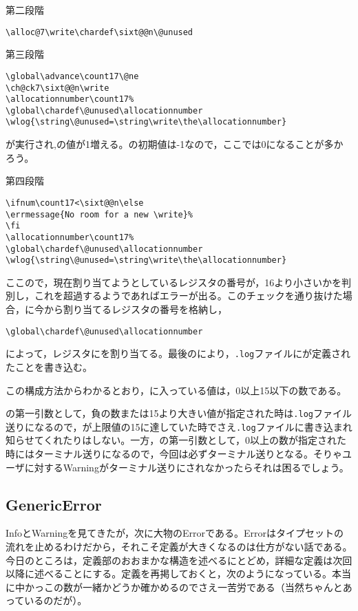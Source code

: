 \documentclass[autodetect-engine,dvipdfmx]{jsarticle}
\begin{document}
\noindent 第二段階
\texsource
\begin{lstlisting}
\alloc@7\write\chardef\sixt@@n\@unused
\end{lstlisting}

\noindent 第三段階
\texsource
\begin{lstlisting}
\global\advance\count17\@ne
\ch@ck7\sixt@@n\write
\allocationnumber\count17%
\global\chardef\@unused\allocationnumber
\wlog{\string\@unused=\string\write\the\allocationnumber}
\end{lstlisting}

が実行され,の値が1増える。の初期値は-1なので，ここでは0になることが多かろう。

\noindent 第四段階
\texsource
\begin{lstlisting}
\ifnum\count17<\sixt@@n\else
\errmessage{No room for a new \write}%
\fi
\allocationnumber\count17%
\global\chardef\@unused\allocationnumber
\wlog{\string\@unused=\string\write\the\allocationnumber}
\end{lstlisting}

ここので，現在割り当てようとしているレジスタの番号が，16より小さいかを判別し，これを超過するようであればエラーが出る。このチェックを通り抜けた場合，に今から割り当てるレジスタの番号を格納し，

\texsource
\begin{lstlisting}
\global\chardef\@unused\allocationnumber
\end{lstlisting}
によって，レジスタにを割り当てる。最後のにより，\texttt{.log}ファイルにが定義されたことを書き込む。

この構成方法からわかるとおり，に入っている値は，0以上15以下の数である。

の第一引数として，負の数または15より大きい値が指定された時は\texttt{.log}ファイル送りになるので，が上限値の15に達していた時でさえ\texttt{.log}ファイルに書き込まれ知らせてくれたりはしない。一方，の第一引数として，0以上の数が指定された時にはターミナル送りになるので，今回は必ずターミナル送りとなる。そりゃユーザに対するWarningがターミナル送りにされなかったらそれは困るでしょう。

\subsection{GenericError}

InfoとWarningを見てきたが，次に大物のErrorである。Errorはタイプセットの流れを止めるわけだから，それこそ定義が大きくなるのは仕方がない話である。今日のところは，定義部のおおまかな構造を述べるにとどめ，詳細な定義は次回以降に述べることにする。定義を再掲しておくと，次のようになっている。本当に中かっこの数が一緒かどうか確かめるのでさえ一苦労である（当然ちゃんとあっているのだが）。
\end{document}
